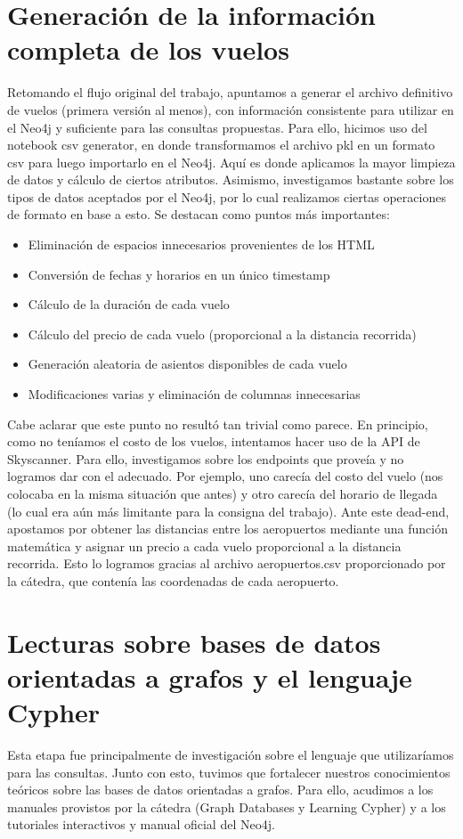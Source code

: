 \documentclass[a4paper,11pt]{article}
\begin{document}
\section{Generación de la información completa de los vuelos}
Retomando el flujo original del trabajo, apuntamos a generar el archivo definitivo de vuelos (primera versión al menos), con información consistente para utilizar en el Neo4j y suficiente para las consultas propuestas.
Para ello, hicimos uso del notebook csv generator, en donde transformamos el archivo pkl en un formato csv para luego importarlo en el Neo4j.
Aquí es donde aplicamos la mayor limpieza de datos y cálculo de ciertos atributos. Asimismo, investigamos bastante sobre los tipos de datos aceptados por el Neo4j, por lo cual realizamos ciertas operaciones de formato en base a esto. Se destacan como puntos más importantes:
\begin{itemize}
\item Eliminación de espacios innecesarios provenientes de los HTML
\item Conversión de fechas y horarios en un único timestamp
\item Cálculo de la duración de cada vuelo
\item Cálculo del precio de cada vuelo (proporcional a la distancia recorrida)
\item Generación aleatoria de asientos disponibles de cada vuelo
\item Modificaciones varias y eliminación de columnas innecesarias
\end{itemize}
Cabe aclarar que este punto no resultó tan trivial como parece.
En principio, como no teníamos el costo de los vuelos, intentamos hacer uso de la API de Skyscanner. Para ello, investigamos sobre los endpoints que proveía y no logramos dar con el adecuado. Por ejemplo, uno carecía del costo del vuelo (nos colocaba en la misma situación que antes) y otro carecía del horario de llegada (lo cual era aún más limitante para la consigna del trabajo).
Ante este dead-end, apostamos por obtener las distancias entre los aeropuertos mediante una función matemática y asignar un precio a cada vuelo proporcional a la distancia recorrida. Esto lo logramos gracias al archivo aeropuertos.csv proporcionado por la cátedra, que contenía las coordenadas de cada aeropuerto.

\section{Lecturas sobre bases de datos orientadas a grafos y el lenguaje Cypher}
Esta etapa fue principalmente de investigación sobre el lenguaje que utilizaríamos para las consultas. Junto con esto, tuvimos que fortalecer nuestros conocimientos teóricos sobre las bases de datos orientadas a grafos.
Para ello, acudimos a los manuales provistos por la cátedra (Graph Databases y Learning Cypher) y a los tutoriales interactivos y manual oficial del Neo4j.
\end{document}
